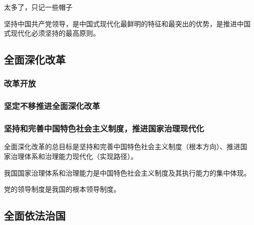 \documentclass[12pt, a4paper, oneside]{ctexart}
\begin{document}
太多了，只记一些帽子

坚持中国共产党领导，是中国式现代化最鲜明的特征和最突出的优势，是推进中国式现代化必须坚持的最高原则。

\subsection{全面深化改革}

\subsubsection{改革开放}

\subsubsection{坚定不移推进全面深化改革}

\subsubsection{坚持和完善中国特色社会主义制度，推进国家治理现代化}

全面深化改革的总目标是坚持和完善中国特色社会主义制度（根本方向）、推进国家治理体系和治理能力现代化（实现路径）。

我国国家治理体系和治理能力是中国特色社会主义制度及其执行能力的集中体现。

党的领导制度是我国的根本领导制度。

\subsection{全面依法治国}
\end{document}
